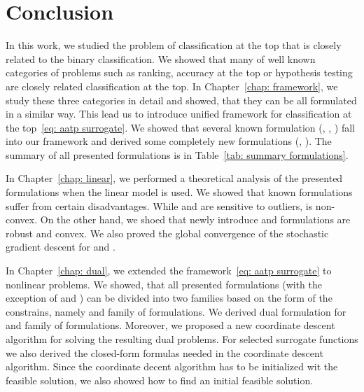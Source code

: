 \chapter*{Conclusion}

In this work, we studied the problem of classification at the top that is closely related to the binary classification. We showed that many of well known categories of problems such as ranking, accuracy at the top or hypothesis testing are closely related classification at the top. In Chapter~\ref{chap: framework}, we study these three categories in detail and showed, that they can be all formulated in a similar way. This lead us to introduce unified framework for classification at the top~\eqref{eq: aatp surrogate}. We showed that several known formulation (\TopPush, \Grill, \tauFPL) fall into our framework and derived some completely new formulations (\PatMat, \PatMatNP). The summary of all presented formulations is in Table~\ref{tab: summary formulations}.

In Chapter~\ref{chap: linear}, we performed a theoretical analysis of the presented formulations when the linear model is used. We showed that known formulations suffer from certain disadvantages. While \TopPush and \tauFPL are sensitive to outliers, \Grill is non-convex. On the other hand, we shoed that newly introduce \PatMat and \PatMatNP formulations are robust and convex. We also  proved the global convergence of the stochastic gradient descent for \PatMat and \PatMatNP.

In Chapter~\ref{chap: dual}, we extended the framework~\eqref{eq: aatp surrogate} to nonlinear problems. We showed, that all presented formulations (with the exception of \Grill and \GrillNP) can be divided into two families based on the form of the constrains, namely \TopPushK and \PatMat family of formulations. We derived dual formulation for \TopPushK and \PatMat family of formulations. Moreover, we proposed a new coordinate descent algorithm for solving the resulting dual problems. For selected surrogate functions we also derived the closed-form formulas needed in the coordinate descent algorithm. Since the coordinate decent algorithm has to be initialized wit the feasible solution, we also showed how to find an initial feasible solution.

